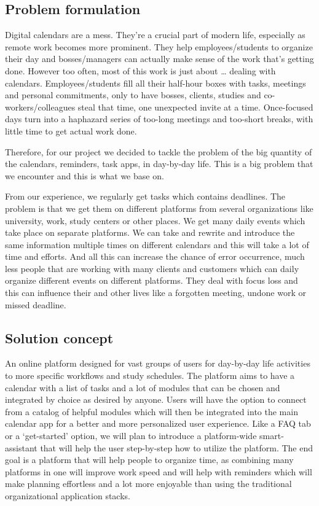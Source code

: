 \subsection{Problem formulation}
\par Digital calendars are a mess. They're a crucial part of modern life, especially as remote work becomes more prominent. They help employees/students to organize their day and bosses/managers can actually make sense of the work that's getting done. However too often, most of this work is just about … dealing with calendars. Employees/students fill all their half-hour boxes with tasks, meetings and personal commitments, only to have bosses, clients, studies and co-workers/colleagues steal that time, one unexpected invite at a time. Once-focused days turn into a haphazard series of too-long meetings and too-short breaks, with little time to get actual work done. 

Therefore, for our project we decided to tackle the problem of the big quantity of the calendars, reminders, task apps, in day-by-day life. This is a big problem that we encounter and this is what we base on. 

From our experience, we regularly get tasks which contains deadlines. The problem is that we get them on different platforms from several organizations like university, work, study centers or other places. We get many daily events which take place on separate platforms. We can take and rewrite and introduce the same information multiple times on different calendars and this will take a lot of time and efforts. And all this can increase the chance of error occurrence, much less people that are working with many clients and customers which can daily organize different events on different platforms. They deal with focus loss and this can influence their and other lives like a forgotten meeting, undone work or missed deadline.  

\subsection{Solution concept}
\par An online platform designed for vast groups of users for day-by-day life activities to more specific workflows and study schedules. The platform aims to have a calendar with a list of tasks and a lot of modules that can be chosen and integrated by choice as desired by anyone. Users will have the option to connect from a catalog of helpful modules which will then be integrated into the main calendar app for a better and more personalized user experience. Like a FAQ tab or a ‘get-started’ option, we will plan to introduce a platform-wide smart-assistant that will help the user step-by-step how to utilize the platform. The end goal is a platform that will help people to organize time, as combining many platforms in one will improve work speed and will help with reminders which will make planning effortless and a lot more enjoyable than using the traditional organizational application stacks.   

